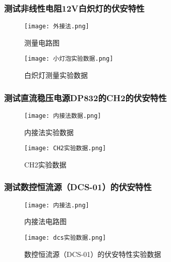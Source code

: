 \documentclass[dvipsnames, svgnames,a4paper,11pt]{article}
\begin{document}
	 
		\subsubsection{测试非线性电阻12V白炽灯的伏安特性}
			\begin{figure}[H]
				\centering
				\texttt{[image: 外接法.png]}
				\caption{测量电路图}
				\label{白炽灯测量电路图}
			\end{figure}
			
			\begin{figure}[H]
				\centering
				\texttt{[image: 小灯泡实验数据.png]}
				\caption{白炽灯测量实验数据}
				\label{白炽灯测量实验数据}
			\end{figure}
		
			\subsubsection{测试直流稳压电源DP832的CH2的伏安特性}
				\begin{figure}[H]
				\centering
				\texttt{[image: 内接法数据.png]}
				\caption{内接法实验数据}
				\label{内接法实验数据}
						\end{figure}
			\begin{figure}[H]
				\centering
				\texttt{[image: CH2实验数据.png]}
				\caption{CH2实验数据}
				\label{CH2实验数据}
			\end{figure}
		
				\subsubsection{测试数控恒流源（DCS-01）的伏安特性}
				\begin{figure}[H]
					\centering
					\texttt{[image: 内接法.png]}
					\caption{内接法电路图}
					\label{内接法电路图}
				\end{figure}
				\begin{figure}[H]
					\centering
					\texttt{[image: dcs实验数据.png]}
					\caption{数控恒流源（DCS-01）的伏安特性实验数据}
					\label{dcs实验数据}
				\end{figure}
\end{document}
